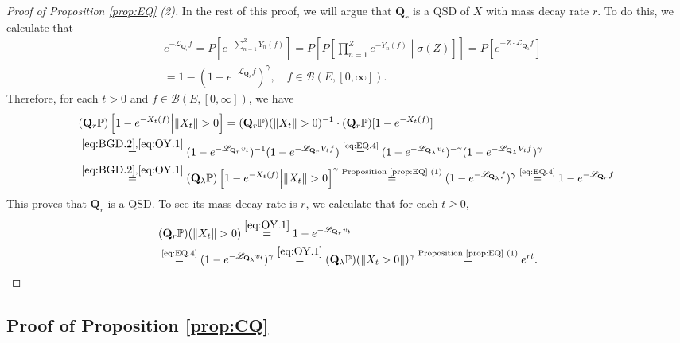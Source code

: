 \documentclass[12pt,a4paper]{amsart}
\numberwithin{equation}{section}
\theoremstyle{plain}
\theoremstyle{definition}
\theoremstyle{remark}
\begin{document}
\begin{proof}[Proof of Proposition \ref{prop:EQ} (2)]
	In the rest of this proof, we will argue that $\mathbf Q_r$ is a QSD of $X$ with mass decay rate $r$.
	 To do this, we calculate that
	\begin{align}
	&e^{- \mathscr L_{\mathbf Q_r} f}
	= P[ e^{-\sum_{n=1}^Z Y_n(f)} ] 	
	= P\left[P\left[ \prod_{n=1}^Z e^{-Y_n(f)} \middle | \sigma(Z)\right]\right]
	= P \left[ e^{-Z \cdot \mathscr L_{\mathbf Q_\lambda } f}\right]
	\\&= 1 - (1 - e^{- \mathscr L_{\mathbf Q_\lambda} f})^\gamma, \quad f\in \mathcal B(E,[0,\infty]).  \label{eq:EQ.4}
	\end{align}
	Therefore, for each $t> 0$ and $f\in \mathcal B(E,[0,\infty])$, we have
	\begin{align}
	&(\mathbf Q_r \mathbb P)\left[ 1 - e^{-X_t (f)} \middle|\|X_t\|>0 \right]
	= (\mathbf Q_r \mathbb P)(\|X_t\| >0)^{-1} \cdot (\mathbf Q_r \mathbb P) [1 - e^{- X_t(f)}]
	\\&\overset{\eqref{eq:BGD.2}, \eqref{eq:OY.1}}= (1 - e^{- \mathscr L_{\mathbf Q_r} v_t})^{-1}  (1 - e^{- \mathscr L_{\mathbf Q_r} V_tf})
	\overset{\text{\eqref{eq:EQ.4}}}= (1 - e^{- \mathscr L_{\mathbf Q_\lambda} v_t})^{-\gamma}(1 - e^{- \mathscr L_{\mathbf Q_\lambda} V_tf})^{\gamma}
	\\&\overset{\eqref{eq:BGD.2}, \eqref{eq:OY.1}}= (\mathbf Q_\lambda \mathbb P)\left[1 - e^{- X_t(f)}\middle| \|X_t\|>0\right]^{\gamma}
	\overset{\text{Proposition \ref{prop:EQ} (1)}}= (1 - e^{- \mathscr L_{\mathbf Q_\lambda} f})^{\gamma}
	\overset{\text{\eqref{eq:EQ.4}}}= 1 - e^{- \mathscr L_{\mathbf Q_r} f}.
	\end{align}
This proves that $\mathbf Q_r$ is a QSD.
	To see its mass decay rate is $r$, we calculate that for each $t\geq 0$,
\begin{align}
	&(\mathbf Q_r \mathbb P)(\|X_t\|>0)
	\overset{\eqref{eq:OY.1}}= 1 - e^{- \mathscr L_{\mathbf Q_r} v_t}
	\\& \overset{\text{\eqref{eq:EQ.4}}}= (1 - e^{- \mathscr L_{\mathbf Q_\lambda} v_t})^\gamma
	\overset{\eqref{eq:OY.1}}= (\mathbf Q_\lambda \mathbb P) (\|X_t > 0\|)^\gamma \overset{\text{Proposition \ref{prop:EQ} (1)}}= e^{ r t}. \qedhere
\end{align}
\end{proof}

\subsection{Proof of Proposition \ref{prop:CQ}} \label{sec:CQ}
\end{document}
